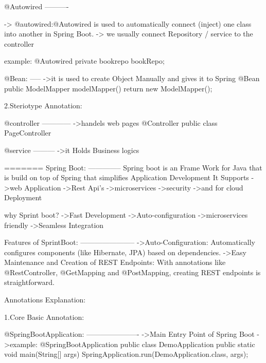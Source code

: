                         
@Autowired
----------

      ->  @autowired:@Autowired is used to automatically connect (inject) one class into another in Spring Boot.
      ->  we usually connect Repository / service to the controller

            example:
              @Autowired
             private bookrepo bookRepo;

@Bean:
-----
      ->it is used to create Object Manually and gives it to Spring
      @Bean
            public ModelMapper modelMapper()
            {
                  return new ModelMapper();
            }
        

2.Steriotype Annotation:

@controller
------------
            ->handels web pages 
                @Controller
                public class PageController {
                }

@service
---------
            ->it Holds Business logics
            
=======
Spring Boot:
--------------
        Spring boot is an Frame Work for Java that is build on top of Spring that simplifies Application Development
        It Supports
                ->web Application
                ->Rest Api's
                ->microservices
                ->security
                ->and for cloud Deployment


why Sprint boot?
            ->Fast Development
            ->Auto-configuration
            ->microservices friendly
            ->Seamless Integration

Features of SprintBoot:
-----------------------
                ->Auto-Configuration: Automatically configures components (like Hibernate, JPA) based on dependencies. 
                ->Easy Maintenance and Creation of REST Endpoints: With annotations like @RestController, @GetMapping and @PostMapping, creating REST endpoints is straightforward.


Annotations Explanation:

1.Core Basic Annotation:

@SpringBootApplication:
----------------------
                  ->Main Entry Point of Spring Boot
                  ->example:
                  @SpringBootApplication
                              public class DemoApplication {
                                          public static void main(String[] args) {
                                          SpringApplication.run(DemoApplication.class, args);
                                                 }
                                          }

